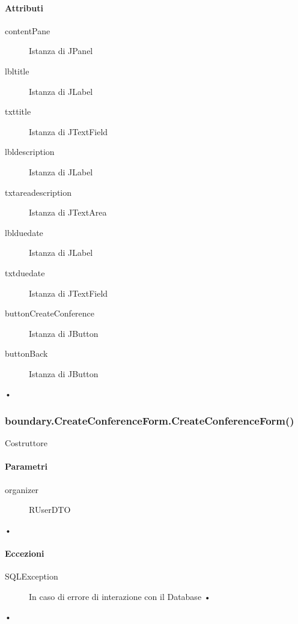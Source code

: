 \paragraph{Attributi}
\begin{description}
\item[contentPane] Istanza di JPanel
\item[lbltitle] Istanza di JLabel
\item[txttitle] Istanza di JTextField
\item[lbldescription] Istanza di JLabel
\item[txtareadescription] Istanza di JTextArea
\item[lblduedate] Istanza di JLabel
\item[txtduedate] Istanza di JTextField
\item[buttonCreateConference] Istanza di JButton
\item[buttonBack] Istanza di JButton

\end{description}•

\subsubsection{boundary.CreateConferenceForm.CreateConferenceForm()}
Costruttore
\paragraph{Parametri}
\begin{description}
\item[organizer] RUserDTO
\end{description}•
\paragraph{Eccezioni}
\begin{description}
\item[SQLException]  In caso di errore di interazione con il Database
•
\end{description}• 














